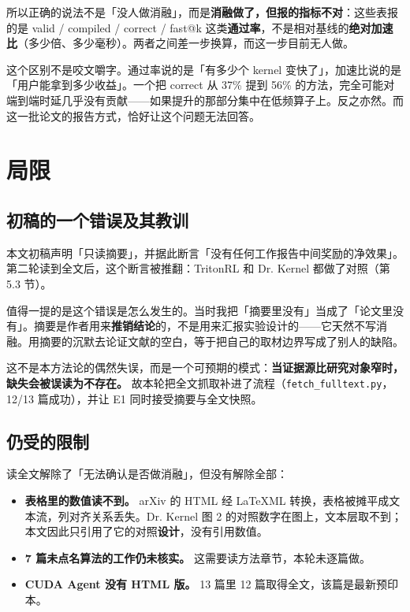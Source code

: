 所以正确的说法不是「没人做消融」，而是\textbf{消融做了，但报的指标不对}：这些表报的是 valid / compiled / correct / fast@k 这类\textbf{通过率}，不是相对基线的\textbf{绝对加速比}（多少倍、多少毫秒）。两者之间差一步换算，而这一步目前无人做。

这个区别不是咬文嚼字。通过率说的是「有多少个 kernel 变快了」，加速比说的是「用户能拿到多少收益」。一个把 correct 从 37\% 提到 56\% 的方法，完全可能对端到端时延几乎没有贡献——如果提升的那部分集中在低频算子上。反之亦然。而这一批论文的报告方式，恰好让这个问题无法回答。

\section{局限}

\subsection{初稿的一个错误及其教训}

本文初稿声明「只读摘要」，并据此断言「没有任何工作报告中间奖励的净效果」。第二轮读到全文后，这个断言被推翻：TritonRL 和 Dr. Kernel 都做了对照（第 5.3 节）。

值得一提的是这个错误是怎么发生的。当时我把「摘要里没有」当成了「论文里没有」。摘要是作者用来\textbf{推销结论}的，不是用来汇报实验设计的——它天然不写消融。用摘要的沉默去论证文献的空白，等于把自己的取材边界写成了别人的缺陷。

这不是本方法论的偶然失误，而是一个可预期的模式：\textbf{当证据源比研究对象窄时，缺失会被误读为不存在。} 故本轮把全文抓取补进了流程（\texttt{fetch\_fulltext.py}，12/13 篇成功），并让 E1 同时接受摘要与全文快照。

\subsection{仍受的限制}

读全文解除了「无法确认是否做消融」，但没有解除全部：

\begin{itemize}
\item \textbf{表格里的数值读不到。} arXiv 的 HTML 经 LaTeXML 转换，表格被摊平成文本流，列对齐关系丢失。Dr. Kernel 图 2 的对照数字在图上，文本层取不到；本文因此只引用了它的对照\textbf{设计}，没有引用数值。
\item \textbf{7 篇未点名算法的工作仍未核实。} 这需要读方法章节，本轮未逐篇做。
\item \textbf{CUDA Agent 没有 HTML 版。} 13 篇里 12 篇取得全文，该篇是最新预印本。
\end{itemize}

